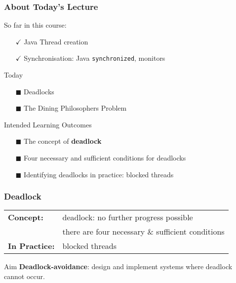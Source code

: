 \begin{frame}
  \frametitle{About Today's Lecture}

  \begin{block}{So far in this course:}
      \begin{itemize}
        \item[{\color{DarkGreen}$\checkmark$}] Java Thread creation
        \item[{\color{DarkGreen}$\checkmark$}] Synchronisation: Java \texttt{synchronized}, monitors
      \end{itemize}
  \end{block}

  \begin{block}{Today}
      \begin{itemize}
        \item[{\color{DarkBlue}$\blacksquare$}] Deadlocks
        \item[{\color{DarkBlue}$\blacksquare$}] The Dining Philosophers Problem
      \end{itemize}
  \end{block}

  \begin{block}{\color{DarkGreen}Intended Learning Outcomes}
      \begin{itemize}
        \item[{\color{DarkGreen}$\blacksquare$}] The concept of \textbf{deadlock}
        \item[{\color{DarkGreen}$\blacksquare$}] Four necessary and sufficient conditions for deadlocks
        \item[{\color{DarkGreen}$\blacksquare$}] Identifying deadlocks in practice: blocked threads
      \end{itemize}
  \end{block}
\end{frame}

\begin{frame}
  \frametitle{Deadlock}
  \begin{tcolorbox}[colback=white,colframe=DarkGreen]
    \begin{tabularx}{\linewidth}{l l}
      \textbf{Concept:} & \alert{deadlock}: no further progress possible
      \\
      & there are four necessary \& sufficient conditions
      \\
      \textbf{In Practice:} & blocked threads
    \end{tabularx}
  \end{tcolorbox}

  \begin{minipage}{.4\textwidth}
    \hspace{10cm}
  \end{minipage}
  \begin{minipage}{.54\textwidth}
  \begin{alertblock}{Aim}
    \textbf{Deadlock-avoidance}: design and implement systems where deadlock cannot
    occur.
  \end{alertblock}
  \end{minipage}
\end{frame}

